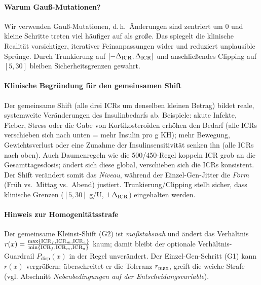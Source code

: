 \paragraph{Warum Gauß-Mutationen?}
Wir verwenden Gauß‑Mutationen, d.\,h.\ Änderungen sind zentriert um \(0\) und kleine Schritte treten viel häufiger auf als große. Das spiegelt die klinische Realität vorsichtiger, iterativer Feinanpassungen wider und reduziert unplausible Sprünge. Durch Trunkierung auf \([-\Delta_{\mathrm{ICR}},\Delta_{\mathrm{ICR}}]\) und anschließendes Clipping auf \([5,30]\) bleiben Sicherheitsgrenzen gewahrt.

\paragraph{Klinische Begründung für den gemeinsamen Shift}
Der gemeinsame Shift (alle drei ICRs um denselben kleinen Betrag) bildet reale, systemweite Veränderungen des Insulinbedarfs ab. Beispiele: akute Infekte, Fieber, Stress oder die Gabe von Kortikosteroiden erhöhen den Bedarf (alle ICRs verschieben sich nach unten = mehr Insulin pro g KH); mehr Bewegung, Gewichtsverlust oder eine Zunahme der Insulinsensitivität senken ihn (alle ICRs nach oben). Auch Daumenregeln wie die 500/450‑Regel koppeln ICR grob an die Gesamttagesdosis; ändert sich diese global, verschieben sich die ICRs konsistent. Der Shift verändert somit das \emph{Niveau}, während der Einzel‑Gen‑Jitter die \emph{Form} (Früh vs.\ Mittag vs.\ Abend) justiert. Trunkierung/Clipping stellt sicher, dass klinische Grenzen (\([5,30]\) g/U, \(\pm\Delta_{\mathrm{ICR}}\)) eingehalten werden.

\paragraph{Hinweis zur Homogenitätsstrafe}
Der gemeinsame Kleinst-Shift (G2) ist \emph{maßstabsnah} und ändert das Verhältnis \(r(x)=\tfrac{\max\{\mathrm{ICR}_f,\mathrm{ICR}_m,\mathrm{ICR}_a\}}{\min\{\mathrm{ICR}_f,\mathrm{ICR}_m,\mathrm{ICR}_a\}}\) kaum; damit bleibt der optionale Verhältnis-Guardrail \(P_{\mathrm{disp}}(x)\) in der Regel unverändert. Der Einzel-Gen-Schritt (G1) kann \(r(x)\) vergrößern; überschreitet er die Toleranz \(r_{\max}\), greift die weiche Strafe (vgl. Abschnitt \emph{Nebenbedingungen auf der Entscheidungsvariable}).

